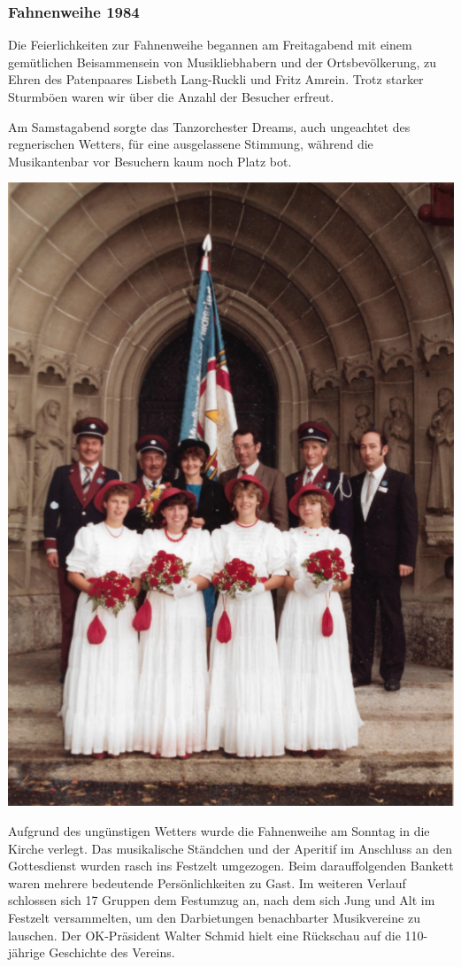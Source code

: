 \clearpage
\begin{history}

    \subsubsection*{Fahnenweihe 1984}

    Die Feierlichkeiten zur Fahnenweihe begannen am Freitagabend mit einem
    gemütlichen Beisammensein von Musikliebhabern und der Ortsbevölkerung, zu
    Ehren des Patenpaares Lisbeth Lang-Ruckli und Fritz Amrein. Trotz starker
    Sturmböen waren wir über die Anzahl der Besucher erfreut.

    Am Samstagabend sorgte das Tanzorchester Dreams, auch ungeachtet des
    regnerischen Wetters, für eine ausgelassene Stimmung, während die
    Musikantenbar vor Besuchern kaum noch Platz bot.

    \begin{MulticolFigure}
        \centering
        \includegraphics[width=0.6\linewidth]{./chap/1975-2000/1984/Fahnenweihe-1984.pdf}
    \end{MulticolFigure}

    Aufgrund des ungünstigen Wetters wurde die Fahnenweihe am Sonntag in die
    Kirche verlegt. Das musikalische Ständchen und der Aperitif im Anschluss an
    den Gottesdienst wurden rasch ins Festzelt umgezogen. Beim darauffolgenden
    Bankett waren mehrere bedeutende Persönlichkeiten zu Gast. Im weiteren
    Verlauf schlossen sich 17 Gruppen dem Festumzug an, nach dem sich Jung und
    Alt im Festzelt versammelten, um den Darbietungen benachbarter Musikvereine
    zu lauschen. Der OK-Präsident Walter Schmid hielt eine Rückschau auf die
    110-jährige Geschichte des Vereins.


\end{history}
